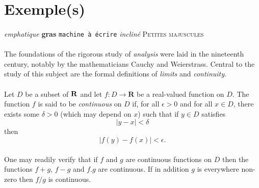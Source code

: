 
\appendix

    \section{Exemple(s)}

        \paragraph{}
            \emph{emphatique}
            \textbf{gras}
            \texttt{machine à écrire}
            \textsl{incliné}
            \textsc{Petites majuscules}

        \paragraph{}
            The foundations of the rigorous study of \emph{analysis}
            were laid in the nineteenth century, notably by the
            mathematicians Cauchy and Weierstrass. Central to the
            study of this subject are the formal definitions of
            \emph{limits} and \emph{continuity}.

        \paragraph{}
            Let $D$ be a subset of $\bf R$ and let
            $f \colon D \to \mathbf{R}$ be a real-valued function on
            $D$. The function $f$ is said to be \emph{continuous} on
            $D$ if, for all $\epsilon > 0$ and for all $x \in D$,
            there exists some $\delta > 0$ (which may depend on $x$)
            such that if $y \in D$ satisfies
            \[ |y - x| < \delta \]
            then
            \[ |f(y) - f(x)| < \epsilon. \]

        \paragraph{}
            One may readily verify that if $f$ and $g$ are continuous
            functions on $D$ then the functions $f+g$, $f-g$ and
            $f.g$ are continuous. If in addition $g$ is everywhere
            non-zero then $f/g$ is continuous.



    \lstset{
        language=perl,
        basicstyle=\ttfamily\small, %
        columns=flexible, %
        tabsize=2, %
        extendedchars=true, %
        showspaces=false, %
        showstringspaces=false, %
        numbers=left, %
        numberstyle=\tiny, %
        breaklines=true, %
        breakautoindent=true, %
        captionpos=b
    }


